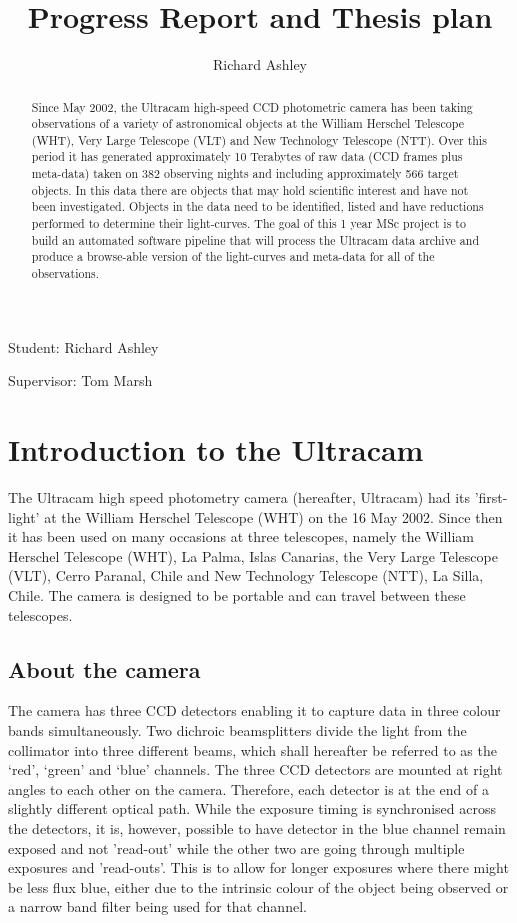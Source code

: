 \documentclass[a4paper,10pt]{article}
\begin{document}
\title{Progress Report and Thesis plan}
\author{Richard Ashley}
\maketitle
\begin{flushright}
Student: Richard Ashley

Supervisor: Tom Marsh
\end{flushright}

\begin{abstract} 
Since May 2002, the  Ultracam high-speed CCD photometric camera has been taking observations of a variety of astronomical objects at the William Herschel Telescope (WHT), Very Large Telescope (VLT) and New Technology Telescope (NTT). Over this period it has generated approximately 10 Terabytes of raw data (CCD frames plus meta-data) taken on 382 observing nights and including 
approximately 566 target objects. In this data there are objects that may hold scientific interest and have not been investigated. 
Objects in the data need to be identified, listed and have reductions performed to determine their light-curves. The goal of 
this 1 year MSc project is to build an automated software pipeline that will process the Ultracam data archive and produce a browse-able 
version of the light-curves and meta-data for all of the observations. 
\end{abstract}

\section{Introduction to the Ultracam} 

The Ultracam high speed photometry camera (hereafter, Ultracam) had its 'first-light' at the William Herschel Telescope (WHT) on the 16 May 2002. Since then it has been used on many occasions at three telescopes, namely the William Herschel Telescope (WHT), La Palma, Islas Canarias, the Very Large Telescope (VLT), Cerro Paranal, Chile and New Technology Telescope (NTT), La Silla, Chile. The camera is designed to be portable and can travel between these telescopes. 

\subsection{About the camera}
The camera has three CCD detectors enabling it to capture data in three colour bands simultaneously. Two dichroic beamsplitters divide the light from the collimator into three different beams, which shall hereafter be referred to as the ‘red’, ‘green’ and ‘blue’ channels. The three CCD detectors are mounted at right angles to each other on the camera. Therefore, each detector is at the end of a slightly different optical path. While the exposure timing is synchronised across the detectors, it is, however, possible to have detector in the blue channel remain exposed and not 'read-out' while the other two are going through multiple exposures and 'read-outs'. This is to allow for longer exposures where there might be less flux blue, either due to the intrinsic colour of the object being observed or a narrow band filter being used for that channel. 
\end{document}
